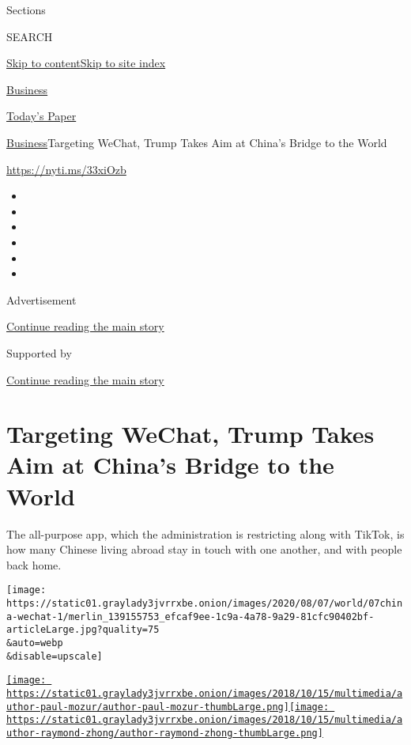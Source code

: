 Sections

SEARCH

\protect\hyperlink{site-content}{Skip to
content}\protect\hyperlink{site-index}{Skip to site index}

\href{https://www.nytimes3xbfgragh.onion/section/business}{Business}

\href{https://myaccount.nytimes3xbfgragh.onion/auth/login?response_type=cookie\&client_id=vi}{}

\href{https://www.nytimes3xbfgragh.onion/section/todayspaper}{Today's
Paper}

\href{/section/business}{Business}\textbar{}Targeting WeChat, Trump
Takes Aim at China's Bridge to the World

\url{https://nyti.ms/33xiOzb}

\begin{itemize}
\item
\item
\item
\item
\item
\item
\end{itemize}

Advertisement

\protect\hyperlink{after-top}{Continue reading the main story}

Supported by

\protect\hyperlink{after-sponsor}{Continue reading the main story}

\hypertarget{targeting-wechat-trump-takes-aim-at-chinas-bridge-to-the-world}{%
\section{Targeting WeChat, Trump Takes Aim at China's Bridge to the
World}\label{targeting-wechat-trump-takes-aim-at-chinas-bridge-to-the-world}}

The all-purpose app, which the administration is restricting along with
TikTok, is how many Chinese living abroad stay in touch with one
another, and with people back home.

\texttt{[image: https://static01.graylady3jvrrxbe.onion/images/2020/08/07/world/07china-wechat-1/merlin\_139155753\_efcaf9ee-1c9a-4a78-9a29-81cfc90402bf-articleLarge.jpg?quality=75\\\&auto=webp\\\&disable=upscale]}

\href{https://www.nytimes3xbfgragh.onion/by/paul-mozur}{\texttt{[image: https://static01.graylady3jvrrxbe.onion/images/2018/10/15/multimedia/author-paul-mozur/author-paul-mozur-thumbLarge.png]}}\href{https://www.nytimes3xbfgragh.onion/by/raymond-zhong}{\texttt{[image: https://static01.graylady3jvrrxbe.onion/images/2018/10/15/multimedia/author-raymond-zhong/author-raymond-zhong-thumbLarge.png]}}


